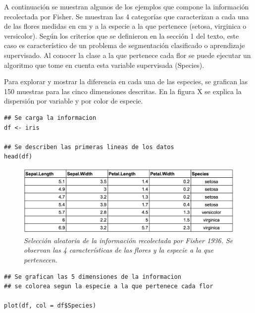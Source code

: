 \documentclass[letterpaper,12pt, spanish, oneside]{book} %
\begin{document}
A continuación se muestran algunos de los ejemplos que compone la información recolectada por Fisher. Se muestran las 4 categorías que caracterizan a cada una de las flores medidas en cm y a la especie a la que pertenece (setosa, virginica o versicolor). Según los criterios que se definieron en la sección 1 del texto, este caso es característico de un problema de segmentación clasificado o aprendizaje supervisado. Al conocer la clase a la que pertenece cada flor se puede ejecutar un algoritmo que tome en cuenta esta variable supervisada (Species).

Para explorar y mostrar la diferencia en cada una de las especies, se grafican las 150 muestras para las cinco dimensiones descritas. En la figura X se explica la dispersión por variable y por color de especie. 

\begin{lstlisting}
## Se carga la informacion
df <- iris

## Se describen las primeras lineas de los datos
head(df)

\end{lstlisting}

\begin{figure}[H]
\centering
\includegraphics[width=1\textwidth]{iris2.png}
\caption{\label{fig:frog2}\textit{Selección aleatoria de la información recolectada por Fisher 1936. Se observan las 4 características de las flores y la especie a la que pertenecen. }}
\end{figure}

\begin{lstlisting}
## Se grafican las 5 dimensiones de la informacion
## se colorea segun la especie a la que pertenece cada flor

plot(df, col = df$Species)
\end{lstlisting}
\end{document}
